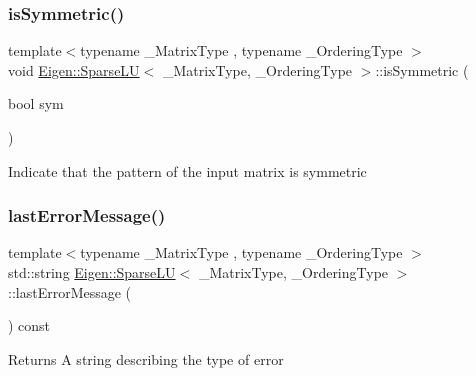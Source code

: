 \subsubsection{\texorpdfstring{isSymmetric()}{isSymmetric()}}
{\footnotesize\ttfamily template$<$typename \+\_\+\+Matrix\+Type , typename \+\_\+\+Ordering\+Type $>$ \\
void \mbox{\hyperlink{class_eigen_1_1_sparse_l_u}{Eigen\+::\+Sparse\+LU}}$<$ \+\_\+\+Matrix\+Type, \+\_\+\+Ordering\+Type $>$\+::is\+Symmetric (\begin{DoxyParamCaption}\item[{bool}]{sym }\end{DoxyParamCaption})\hspace{0.3cm}{\ttfamily [inline]}}

Indicate that the pattern of the input matrix is symmetric \mbox{\label{class_eigen_1_1_sparse_l_u_a5458c4e851d7d75c8ca92c4fd02d2adb}} 
\subsubsection{\texorpdfstring{lastErrorMessage()}{lastErrorMessage()}}
{\footnotesize\ttfamily template$<$typename \+\_\+\+Matrix\+Type , typename \+\_\+\+Ordering\+Type $>$ \\
std\+::string \mbox{\hyperlink{class_eigen_1_1_sparse_l_u}{Eigen\+::\+Sparse\+LU}}$<$ \+\_\+\+Matrix\+Type, \+\_\+\+Ordering\+Type $>$\+::last\+Error\+Message (\begin{DoxyParamCaption}{ }\end{DoxyParamCaption}) const\hspace{0.3cm}{\ttfamily [inline]}}

\begin{DoxyReturn}{Returns}
A string describing the type of error 
\end{DoxyReturn}
\mbox{\label{class_eigen_1_1_sparse_l_u_a89e30a7df205596784a5a73f4768eaec}} 
